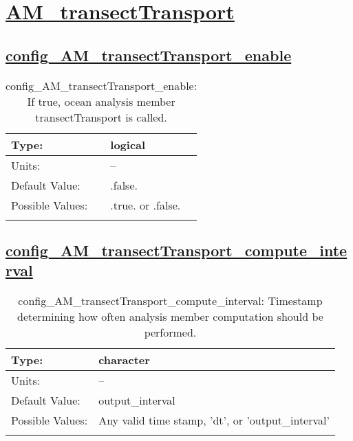 \section[AM\_transectTransport]{\hyperref[sec:nm_tab_AM_transectTransport]{AM\_transectTransport}}
\label{sec:nm_sec_AM_transectTransport}
\subsection[config\_AM\_transectTransport\_enable]{\hyperref[sec:nm_tab_AM_transectTransport]{config\_AM\_transectTransport\_enable}}
\label{subsec:nm_sec_config_AM_transectTransport_enable}
\begin{center}
\begin{longtable}{| p{2.0in} || p{4.0in} |}
    \hline
    Type: & logical \\
    \hline
    Units: & -- \\
    \hline
    Default Value: & .false. \\
    \hline
    Possible Values: & .true. or .false. \\
    \hline
    \caption{config\_AM\_transectTransport\_enable: If true, ocean analysis member transectTransport is called.}
\end{longtable}
\end{center}
\subsection[config\_AM\_transectTransport\_compute\_interval]{\hyperref[sec:nm_tab_AM_transectTransport]{config\_AM\_transectTransport\_compute\_interval}}
\label{subsec:nm_sec_config_AM_transectTransport_compute_interval}
\begin{center}
\begin{longtable}{| p{2.0in} || p{4.0in} |}
    \hline
    Type: & character \\
    \hline
    Units: & -- \\
    \hline
    Default Value: & output\_interval \\
    \hline
    Possible Values: & Any valid time stamp, 'dt', or 'output\_interval' \\
    \hline
    \caption{config\_AM\_transectTransport\_compute\_interval: Timestamp determining how often analysis member computation should be performed.}
\end{longtable}
\end{center}
